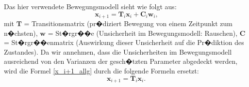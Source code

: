 Das hier verwendete Bewegungsmodell sieht wie folgt aus:
\begin{equation}\label{x_i+1_allg}
\boldsymbol{x}_{i+1} = \boldsymbol{T}_i\boldsymbol{x}_i + \boldsymbol{C}_i\boldsymbol{w}_i \text{,}
\end{equation}
mit $\boldsymbol{T}$ = Transitionsmatrix (pr�diziert Bewegung von einem Zeitpunkt zum n�chsten), $\boldsymbol{w}$ = St�rgr��e (Unsicherheit im Bewegungsmodell: Rauschen), $\boldsymbol{C}$ = St�rgr��enmatrix (Auswirkung dieser Unsicherheit auf die Pr�diktion des Zustandes). Da wir annehmen, dass die Unsicherheiten im Bewegungsmodell ausreichend von den Varianzen der gesch�tzten Parameter abgedeckt werden, wird die Formel \ref{x_i+1_allg} durch die folgende Formeln ersetzt:
\begin{equation}\label{x_i+1}
\boldsymbol{x}_{i+1} = \boldsymbol{T}_i\boldsymbol{x}_i.
\end{equation}

